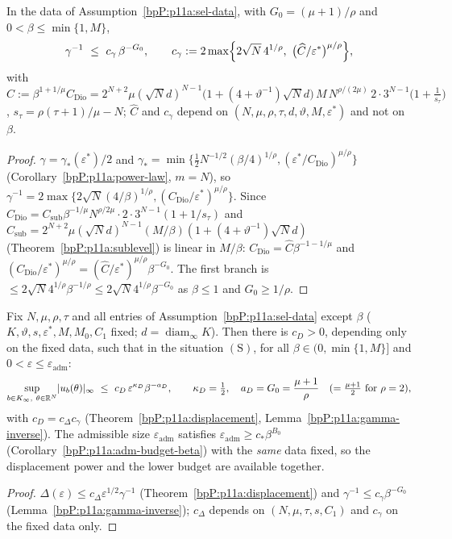 \begin{lemma}\label{bpP:p11a:gamma-inverse}
In the data of Assumption~\ref{bpP:p11a:sel-data}, with $G_0=(\mu+1)/\rho$ and $0<\beta\le\min\{1,M\}$,
\[\gamma^{-1}\ \le\ c_\gamma\,\beta^{-G_0},\qquad c_\gamma:=2\max\Bigl\{2\sqrt N\,4^{1/\rho},\ \bigl(\widehat C/\varepsilon^*\bigr)^{\mu/\rho}\Bigr\},\]
with $\widehat C:=\beta^{1+1/\mu}C_{\mathrm{Dio}}=2^{N+2}\mu(\sqrt Nd)^{N-1}\bigl(1+(4+\vartheta^{-1})\sqrt Nd\bigr)\,M\,N^{\rho/(2\mu)}\,2\cdot3^{N-1}\bigl(1+\tfrac1{s_\tau}\bigr)$, $s_\tau=\rho(\tau+1)/\mu-N$; $\widehat C$ and $c_\gamma$ depend on $(N,\mu,\rho,\tau,d,\vartheta,M,\varepsilon^*)$ and not on $\beta$.
\end{lemma}
\begin{proof}
\label{stepP:p11a:gi-branches} $\gamma=\gamma_*(\varepsilon^*)/2$ and $\gamma_*=\min\{\frac12N^{-1/2}(\beta/4)^{1/\rho},(\varepsilon^*/C_{\mathrm{Dio}})^{\mu/\rho}\}$ (Corollary~\ref{bpP:p11a:power-law}, $m=N$), so $\gamma^{-1}=2\max\{2\sqrt N(4/\beta)^{1/\rho},(C_{\mathrm{Dio}}/\varepsilon^*)^{\mu/\rho}\}$. Since $C_{\mathrm{Dio}}=C_{\mathrm{sub}}\beta^{-1/\mu}N^{\rho/2\mu}\cdot2\cdot3^{N-1}(1+1/s_\tau)$ and $C_{\mathrm{sub}}=2^{N+2}\mu(\sqrt Nd)^{N-1}(M/\beta)(1+(4+\vartheta^{-1})\sqrt Nd)$ (Theorem~\ref{bpP:p11a:sublevel}) is linear in $M/\beta$: $C_{\mathrm{Dio}}=\widehat C\beta^{-1-1/\mu}$ and $(C_{\mathrm{Dio}}/\varepsilon^*)^{\mu/\rho}=(\widehat C/\varepsilon^*)^{\mu/\rho}\beta^{-G_0}$. The first branch is $\le2\sqrt N4^{1/\rho}\beta^{-1/\rho}\le2\sqrt N4^{1/\rho}\beta^{-G_0}$ as $\beta\le1$ and $G_0\ge1/\rho$.
\end{proof}

\begin{corollary}\label{bpP:p11a:displacement-power}
Fix $N,\mu,\rho,\tau$ and all entries of Assumption~\ref{bpP:p11a:sel-data} except $\beta$ ($K,\vartheta,s,\varepsilon^*,M,M_0,C_1$ fixed; $d=\operatorname{diam}_\infty K$). Then there is $c_D>0$, depending only on the fixed data, such that in the situation $(\mathrm S)$, for all $\beta\in(0,\min\{1,M\}]$ and $0<\varepsilon\le\varepsilon_{\mathrm{adm}}$:
\[\sup_{b\in K_\infty,\ \theta\in\R^N}\lvert u_b(\theta)\rvert_\infty\ \le\ c_D\,\varepsilon^{\kappa_D}\beta^{-a_D},\qquad \kappa_D=\tfrac12,\quad a_D=G_0=\frac{\mu+1}\rho\quad(=\tfrac{\mu+1}2\text{ for }\rho=2),\]
with $c_D=c_\Delta c_\gamma$ (Theorem~\ref{bpP:p11a:displacement}, Lemma~\ref{bpP:p11a:gamma-inverse}). The admissible size $\varepsilon_{\mathrm{adm}}$ satisfies $\varepsilon_{\mathrm{adm}}\ge c_*\beta^{B_0}$ (Corollary~\ref{bpP:p11a:adm-budget-beta}) with the \emph{same} data fixed, so the displacement power and the lower budget are available together.
\end{corollary}
\begin{proof}
\label{stepP:p11a:dpc-comb} $\Delta(\varepsilon)\le c_\Delta\varepsilon^{1/2}\gamma^{-1}$ (Theorem~\ref{bpP:p11a:displacement}) and $\gamma^{-1}\le c_\gamma\beta^{-G_0}$ (Lemma~\ref{bpP:p11a:gamma-inverse}); $c_\Delta$ depends on $(N,\mu,\tau,s,C_1)$ and $c_\gamma$ on the fixed data only.
\end{proof}

